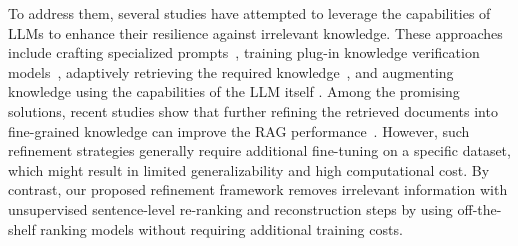 
To address them, several studies have attempted to leverage the capabilities of LLMs to enhance their resilience against irrelevant knowledge. 
These approaches include crafting specialized prompts~\cite{self-ask, das}, training plug-in knowledge verification models~\cite{kalmv}, adaptively retrieving the required knowledge~\cite{adaptive-rag, selfrag, ReFeed}, and augmenting knowledge using the capabilities of the LLM itself \cite{gen_read}.
Among the promising solutions, recent studies show that further refining the retrieved documents into fine-grained knowledge can improve the RAG performance~\cite{recomp, REAR, filco, bider}.
However, such refinement strategies generally require additional fine-tuning on a specific dataset, which might result in limited generalizability and high computational cost. 
By contrast, our proposed refinement framework removes irrelevant information with unsupervised sentence-level re-ranking and reconstruction steps by using off-the-shelf ranking models without requiring additional training costs.



